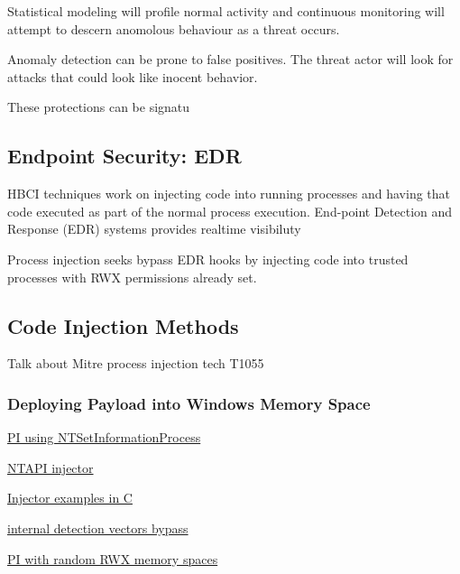 Statistical modeling will profile normal activity and continuous monitoring will attempt to descern anomolous behaviour as a threat occurs.

Anomaly detection can be prone to false positives.  The threat actor will look for attacks that could look like inocent behavior.

These protections can be signatu



\subsection{Endpoint Security: EDR}

HBCI techniques work on injecting code into running processes and having that code executed as part of the normal process
execution.  End-point Detection and Response (EDR) systems \autocite{Hayes:2023} provides realtime visibiluty

Process injection seeks bypass EDR hooks by injecting code into trusted processes with RWX permissions already set.

\subsection{Code Injection Methods}

Talk about Mitre process injection tech T1055 \autocite{Mitre:2017}

\subsubsection{Deploying Payload into Windows Memory Space}


\autocite{Zhan:2018}

\href{https://www.riskinsight-wavestone.com/en/2023/10/process-injection-using-ntsetinformationprocess/}{PI using NTSetInformationProcess}

\href{https://github.com/elddy/Windows-NTAPI-Injector}{NTAPI injector} 

\href{https://gist.github.com/WKL-Sec/96e17188e4c159c2cdf7ff2c111130cc#file-local-c}{Injector examples in C}

\href{https://www.unknowncheats.me/forum/anti-cheat-bypass/286274-internal-detection-vectors-bypass.html}{internal detection vectors bypass}

\href{https://medium.com/@s12deff/process-injection-with-random-rwx-memory-spaces-3e3651149527}{PI with random RWX memory spaces}
